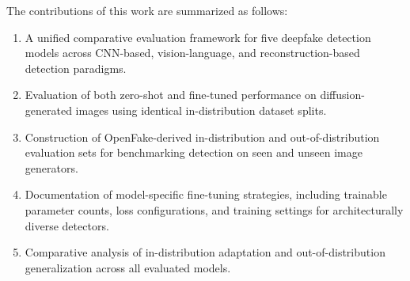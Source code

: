 The contributions of this work are summarized as follows:
\begin{enumerate}
    \item A unified comparative evaluation framework for five deepfake detection models across CNN-based, vision-language, and reconstruction-based detection paradigms.
    \item Evaluation of both zero-shot and fine-tuned performance on diffusion-generated images using identical in-distribution dataset splits.
    \item Construction of OpenFake-derived in-distribution and out-of-distribution evaluation sets for benchmarking detection on seen and unseen image generators.
    \item Documentation of model-specific fine-tuning strategies, including trainable parameter counts, loss configurations, and training settings for architecturally diverse detectors.
    \item Comparative analysis of in-distribution adaptation and out-of-distribution generalization across all evaluated models.
\end{enumerate}